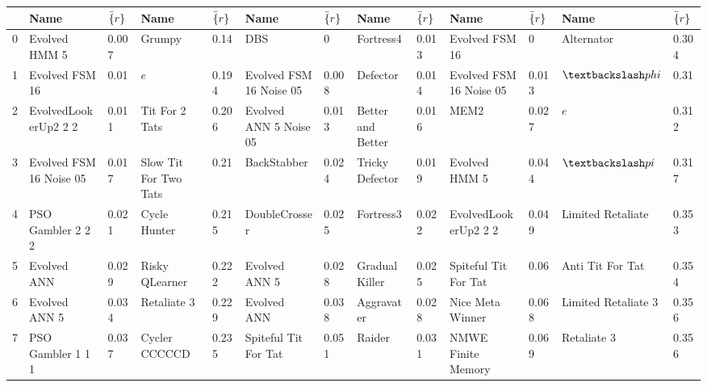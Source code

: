\begin{tabular}{lllllllllllll}
\toprule
{} &                     Name & $ \bar\{r\}$  &                   Name & $ \bar\{r\}$  &                        Name & $ \bar\{r\}$  &               Name & $ \bar\{r\}$  &                       Name & $ \bar\{r\}$  &                 Name & $ \bar\{r\}$  \\
\midrule
0  &            Evolved HMM 5 &     0.007 &                 Grumpy &      0.14 &                         DBS &         0 &          Fortress4 &     0.013 &             Evolved FSM 16 &         0 &           Alternator &     0.304 \\
1  &           Evolved FSM 16 &      0.01 &                    $ e$  &     0.194 &     Evolved FSM 16 Noise 05 &     0.008 &           Defector &     0.014 &    Evolved FSM 16 Noise 05 &     0.013 &               $ \textbackslash phi$  &      0.31 \\
2  &     EvolvedLookerUp2 2 2 &     0.011 &         Tit For 2 Tats &     0.206 &      Evolved ANN 5 Noise 05 &     0.013 &  Better and Better &     0.016 &                       MEM2 &     0.027 &                  $ e$  &     0.312 \\
3  &  Evolved FSM 16 Noise 05 &     0.017 &  Slow Tit For Two Tats &      0.21 &                 BackStabber &     0.024 &    Tricky Defector &     0.019 &              Evolved HMM 5 &     0.044 &                $ \textbackslash pi$  &     0.317 \\
4  &        PSO Gambler 2 2 2 &     0.021 &           Cycle Hunter &     0.215 &               DoubleCrosser &     0.025 &          Fortress3 &     0.022 &       EvolvedLookerUp2 2 2 &     0.049 &    Limited Retaliate &     0.353 \\
5  &              Evolved ANN &     0.029 &         Risky QLearner &     0.222 &               Evolved ANN 5 &     0.028 &     Gradual Killer &     0.025 &       Spiteful Tit For Tat &      0.06 &     Anti Tit For Tat &     0.354 \\
6  &            Evolved ANN 5 &     0.034 &            Retaliate 3 &     0.229 &                 Evolved ANN &     0.038 &         Aggravater &     0.028 &           Nice Meta Winner &     0.068 &  Limited Retaliate 3 &     0.356 \\
7  &        PSO Gambler 1 1 1 &     0.037 &          Cycler CCCCCD &     0.235 &        Spiteful Tit For Tat &     0.051 &             Raider &     0.031 &         NMWE Finite Memory &     0.069 &          Retaliate 3 &     0.356 \\

\end{tabular}
